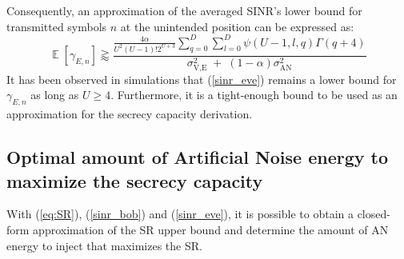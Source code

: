 \documentclass[a4paper,11pt]{article}
\begin{document}
Consequently, an approximation of the averaged SINR's lower bound for transmitted symbols $n$ at the unintended position can be expressed as:
\begin{equation}
    \mathop{\mathbb{E}} \left[\gamma_{E,n}\right] \gtrapprox \frac{\frac{4\alpha}{U^2  (U-1)! 2^{U+3}} \sum_{q=0}^{D}\sum_{l=0}^{D} \psi(U-1,l,q)  \Gamma(q+4)}{\sigma^2_{\text{V,E}} \; + \; (1-\alpha) \sigma^2_{\text{AN}} }
    \label{sinr_eve}
\end{equation}
It has been observed in simulations that (\ref{sinr_eve}) remains a lower bound for $\gamma_{E,n}$ as long as $U\geq4$. Furthermore, it is a tight-enough bound to be used as an approximation for the secrecy capacity derivation.



\subsection{Optimal amount of Artificial Noise energy to maximize the secrecy capacity}
With (\ref{eq:SR}), (\ref{sinr_bob}) and (\ref{sinr_eve}), it is possible to obtain a closed-form approximation of the SR upper bound and determine the amount of AN energy to inject that maximizes the SR.
\end{document}
